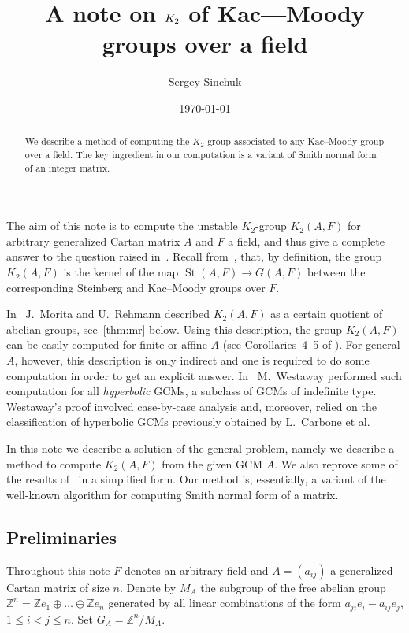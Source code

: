\documentclass[oneside, 10pt]{amsart}
\title{A note on $\K$ of Kac---Moody groups over a field}
\author {Sergey Sinchuk}
\date {\today}
\theoremstyle{plain}
\theoremstyle{remark}
\theoremstyle{definition}
\DeclareMathOperator{\St}{St}
\newcommand{\ZZ}{\mathbb{Z}}
\newcommand{\K}{K_2}
\begin{document}
   
\begin{abstract} We describe a method of computing the $\K$-group associated to any Kac--Moody group over a field.
 The key ingredient in our computation is a variant of Smith normal form of an integer matrix.
\end{abstract}


\maketitle
The aim of this note is to compute the unstable $\K$-group $\K(A, F)$ for arbitrary generalized Cartan matrix $A$ and $F$ a field,
 and thus give a complete answer to the question raised in~\cite{MW}.
Recall from~\cite{MR}, \cite{Ti} that, by definition, the group $\K(A, F)$ is the kernel of the map 
 $\St(A, F) \to G(A, F)$ between the corresponding Steinberg and Kac--Moody groups over $F$.

In~\cite{MR} J.~Morita and U.~Rehmann described $\K(A, F)$ as a certain quotient of abelian groups, see~\cref{thm:mr} below.
Using this description, the group $\K(A, F)$ can be easily computed for finite or affine $A$ (see Corollaries~4--5 of \cite{MR}).
For general $A$, however, this description is only indirect and one is required to do some computation in order to get an explicit answer.
In~\cite{MW} M.~Westaway performed such computation for all {\it hyperbolic} GCMs, a subclass of GCMs of indefinite type. 
Westaway's proof involved case-by-case analysis and, moreover, 
 relied on the classification of hyperbolic GCMs previously obtained by L.~Carbone et al.

In this note we describe a solution of the general problem, namely we describe a method to compute $\K(A, F)$ from the given GCM $A$.
We also reprove some of the results of~\cite{MW} in a simplified form.
Our method is, essentially, a variant of the well-known algorithm for computing Smith normal form of a matrix.

\subsection{Preliminaries}
Throughout this note $F$ denotes an arbitrary field and $A=(a_{ij})$ a generalized Cartan matrix of size $n$.
Denote by $M_A$ the subgroup of the free abelian group $\ZZ^n = \ZZ e_1 \oplus \ldots \oplus \ZZ e_n $ generated by all 
 linear combinations of the form $a_{ji} e_i - a_{ij} e_j$, $1\leq i<j\leq n$.
Set $G_A = \ZZ^n/M_A$.
\end{document}
